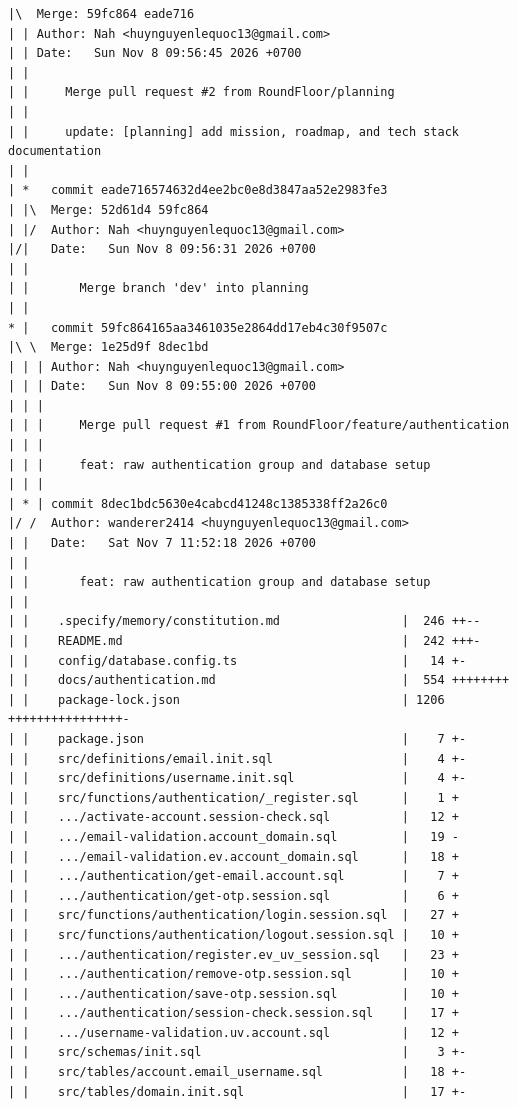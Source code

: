 \documentclass[12pt]{article}
\begin{document}
\begin{lstlisting}[numbers=none,breaklines=true]
|\  Merge: 59fc864 eade716
| | Author: Nah <huynguyenlequoc13@gmail.com>
| | Date:   Sun Nov 8 09:56:45 2026 +0700
| |
| |     Merge pull request #2 from RoundFloor/planning
| |
| |     update: [planning] add mission, roadmap, and tech stack documentation
| |
| *   commit eade716574632d4ee2bc0e8d3847aa52e2983fe3
| |\  Merge: 52d61d4 59fc864
| |/  Author: Nah <huynguyenlequoc13@gmail.com>
|/|   Date:   Sun Nov 8 09:56:31 2026 +0700
| |
| |       Merge branch 'dev' into planning
| |
* |   commit 59fc864165aa3461035e2864dd17eb4c30f9507c
|\ \  Merge: 1e25d9f 8dec1bd
| | | Author: Nah <huynguyenlequoc13@gmail.com>
| | | Date:   Sun Nov 8 09:55:00 2026 +0700
| | |
| | |     Merge pull request #1 from RoundFloor/feature/authentication
| | |
| | |     feat: raw authentication group and database setup
| | |
| * | commit 8dec1bdc5630e4cabcd41248c1385338ff2a26c0
|/ /  Author: wanderer2414 <huynguyenlequoc13@gmail.com>
| |   Date:   Sat Nov 7 11:52:18 2026 +0700
| |
| |       feat: raw authentication group and database setup
| |
| |    .specify/memory/constitution.md                 |  246 ++--
| |    README.md                                       |  242 +++-
| |    config/database.config.ts                       |   14 +-
| |    docs/authentication.md                          |  554 ++++++++
| |    package-lock.json                               | 1206 ++++++++++++++++-
| |    package.json                                    |    7 +-
| |    src/definitions/email.init.sql                  |    4 +-
| |    src/definitions/username.init.sql               |    4 +-
| |    src/functions/authentication/_register.sql      |    1 +
| |    .../activate-account.session-check.sql          |   12 +
| |    .../email-validation.account_domain.sql         |   19 -
| |    .../email-validation.ev.account_domain.sql      |   18 +
| |    .../authentication/get-email.account.sql        |    7 +
| |    .../authentication/get-otp.session.sql          |    6 +
| |    src/functions/authentication/login.session.sql  |   27 +
| |    src/functions/authentication/logout.session.sql |   10 +
| |    .../authentication/register.ev_uv_session.sql   |   23 +
| |    .../authentication/remove-otp.session.sql       |   10 +
| |    .../authentication/save-otp.session.sql         |   10 +
| |    .../authentication/session-check.session.sql    |   17 +
| |    .../username-validation.uv.account.sql          |   12 +
| |    src/schemas/init.sql                            |    3 +-
| |    src/tables/account.email_username.sql           |   18 +-
| |    src/tables/domain.init.sql                      |   17 +-

\end{lstlisting}
\end{document}

